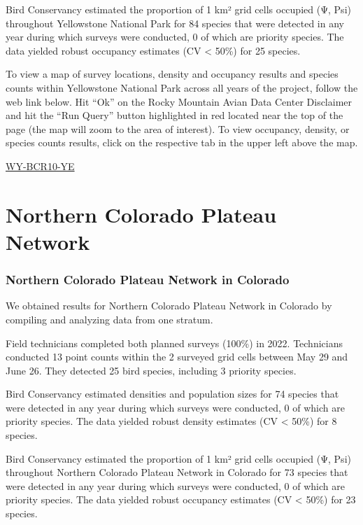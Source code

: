\documentclass[
  letterpaper,
  DIV=11,
  numbers=noendperiod,
  oneside]{scrreprt}
\begin{document}
Bird Conservancy estimated the proportion of 1 km² grid cells occupied
(Ψ, Psi) throughout Yellowstone National Park for 84 species that were
detected in any year during which surveys were conducted, 0 of which are
priority species. The data yielded robust occupancy estimates (CV
\textless{} 50\%) for 25 species.

To view a map of survey locations, density and occupancy results and
species counts within Yellowstone National Park across all years of the
project, follow the web link below. Hit ``Ok'' on the Rocky Mountain
Avian Data Center Disclaimer and hit the ``Run Query'' button
highlighted in red located near the top of the page (the map will zoom
to the area of interest). To view occupancy, density, or species counts
results, click on the respective tab in the upper left above the map.

\href{http://www.rmbo.org/new_site/adc/QueryWindow.aspx\#N4IgzgLgTghhCuBbEAuABCA6gTQLQCEBhAJQEYAGXbAUXWwFMAbRgewHdIWA7etAOTgBLbjEZoACjCgBrEAF8gA=}{WY-BCR10-YE}

\hypertarget{northern-colorado-plateau-network}{%
\section{Northern Colorado Plateau
Network}\label{northern-colorado-plateau-network}}

\hypertarget{northern-colorado-plateau-network-in-colorado}{%
\subsubsection{Northern Colorado Plateau Network in
Colorado}\label{northern-colorado-plateau-network-in-colorado}}

We obtained results for Northern Colorado Plateau Network in Colorado by
compiling and analyzing data from one stratum.

Field technicians completed both planned surveys (100\%) in 2022.
Technicians conducted 13 point counts within the 2 surveyed grid cells
between May 29 and June 26. They detected 25 bird species, including 3
priority species.

Bird Conservancy estimated densities and population sizes for 74 species
that were detected in any year during which surveys were conducted, 0 of
which are priority species. The data yielded robust density estimates
(CV \textless{} 50\%) for 8 species.

Bird Conservancy estimated the proportion of 1 km² grid cells occupied
(Ψ, Psi) throughout Northern Colorado Plateau Network in Colorado for 73
species that were detected in any year during which surveys were
conducted, 0 of which are priority species. The data yielded robust
occupancy estimates (CV \textless{} 50\%) for 23 species.
\end{document}
